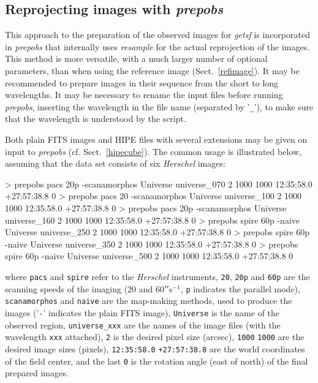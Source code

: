 \documentclass[a4paper,10pt]{article}
\newcommand*{\arcsec}{^{\prime\prime}\mkern-1.2mu}
\begin{document}
\subsection{Reprojecting images with \textsl{prepobs}}
\label{prepobs}

This approach to the preparation of the observed images for \textsl{getsf} is incorporated in \textsl{prepobs} that internally uses
\textsl{resample} for the actual reprojection of the images. This method is more versatile, with a much larger number of optional
parameters, than when using the reference image (Sect.~\ref{refimage}). It may be recommended to prepare images in their sequence
from the short to long wavelengths. It may be necessary to rename the input files before running \textsl{prepobs}, inserting the
wavelength in the file name (separated by '\verb!_!'), to make sure that the wavelength is understood by the script.

Both plain FITS images and HIPE files with several extensions may be given on input to \textsl{prepobs} (cf. Sect.~\ref{hipecube}).
The common usage is illustrated below, assuming that the data set consists of six \emph{Herschel} images:
\begin{verbnobox}[\mbox{}\small]
> prepobs pacs  20p -scanamorphos Universe universe_070 2 1000 1000 12:35:58.0 +27:57:38.8 0
> prepobs pacs  20  -scanamorphos Universe universe_100 2 1000 1000 12:35:58.0 +27:57:38.8 0
> prepobs pacs  20p -scanamorphos Universe universe_160 2 1000 1000 12:35:58.0 +27:57:38.8 0
> prepobs spire 60p -naive        Universe universe_250 2 1000 1000 12:35:58.0 +27:57:38.8 0
> prepobs spire 60p -naive        Universe universe_350 2 1000 1000 12:35:58.0 +27:57:38.8 0
> prepobs spire 60p -naive        Universe universe_500 2 1000 1000 12:35:58.0 +27:57:38.8 0
\end{verbnobox}
where \verb!pacs! and \verb!spire! refer to the \emph{Herschel} instruments, \verb!20!, \verb!20p! and \verb!60p! are the scanning
speeds of the imaging (20 and 60$\arcsec$s$^{-1}$, \verb!p! indicates the parallel mode), \verb!scanamorphos! and \verb!naive! are
the map-making methods, used to produce the images ('\verb!-!' indicates the plain FITS image), \verb!Universe! is the name of the
observed region, \verb!universe_xxx! are the names of the image files (with the wavelength \verb!xxx! attached), \verb!2! is the
desired pixel size (arcsec), \verb!1000! \verb!1000! are the desired image sizes (pixels), \verb!12:35:58.0! \verb!+27:57:38.8! are
the world coordinates of the field center, and the last \verb!0! is the rotation angle (east of north) of the final prepared images.
\end{document}
